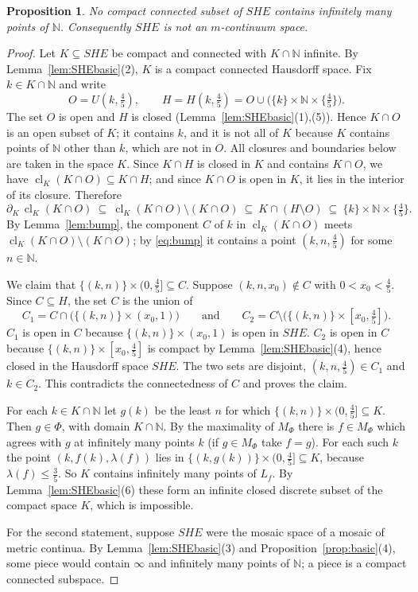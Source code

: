 \documentclass[11pt]{amsart}
\newtheorem{proposition}[theorem]{Proposition}
\theoremstyle{definition}
\theoremstyle{remark}
\newcommand{\N}{\mathbb{N}}
\newcommand{\cl}{\operatorname{cl}}
\newcommand{\SHE}{\mathit{SHE}}
\numberwithin{equation}{section}
\begin{document}
\begin{proposition}\label{prop:SHE}
No compact connected subset of $\SHE$ contains infinitely many points of $\N$. Consequently $\SHE$ is not an $m$-continuum space.
\end{proposition}
\begin{proof}
Let $K\subseteq\SHE$ be compact and connected with $K\cap\N$ infinite. By Lemma~\ref{lem:SHEbasic}(2), $K$ is a compact connected Hausdorff space. Fix $k\in K\cap\N$ and write
\[O=U(k,\tfrac45),\qquad H=H(k,\tfrac45)=O\cup\bigl(\{k\}\times\N\times\{\tfrac45\}\bigr).\]
The set $O$ is open and $H$ is closed (Lemma~\ref{lem:SHEbasic}(1),(5)). Hence $K\cap O$ is an open subset of $K$; it contains $k$, and it is not all of $K$ because $K$ contains points of $\N$ other than $k$, which are not in $O$. All closures and boundaries below are taken in the space $K$. Since $K\cap H$ is closed in $K$ and contains $K\cap O$, we have $\cl_K(K\cap O)\subseteq K\cap H$; and since $K\cap O$ is open in $K$, it lies in the interior of its closure. Therefore
\begin{equation}\label{eq:bump}
\partial_K\,\cl_K(K\cap O)\ \subseteq\ \cl_K(K\cap O)\setminus(K\cap O)\ \subseteq\ K\cap(H\setminus O)\ \subseteq\ \{k\}\times\N\times\{\tfrac45\}.
\end{equation}
By Lemma~\ref{lem:bump}, the component $C$ of $k$ in $\cl_K(K\cap O)$ meets $\cl_K(K\cap O)\setminus(K\cap O)$; by \eqref{eq:bump} it contains a point $(k,n,\frac45)$ for some $n\in\N$.

We claim that $\{(k,n)\}\times(0,\frac45]\subseteq C$. Suppose $(k,n,x_0)\notin C$ with $0<x_0<\frac45$. Since $C\subseteq H$, the set $C$ is the union of
\[C_1=C\cap\bigl(\{(k,n)\}\times(x_0,1)\bigr)\qquad\text{and}\qquad C_2=C\setminus\bigl(\{(k,n)\}\times[x_0,\tfrac45]\bigr).\]
$C_1$ is open in $C$ because $\{(k,n)\}\times(x_0,1)$ is open in $\SHE$. $C_2$ is open in $C$ because $\{(k,n)\}\times[x_0,\frac45]$ is compact by Lemma~\ref{lem:SHEbasic}(4), hence closed in the Hausdorff space $\SHE$. The two sets are disjoint, $(k,n,\frac45)\in C_1$ and $k\in C_2$. This contradicts the connectedness of $C$ and proves the claim.

For each $k\in K\cap\N$ let $g(k)$ be the least $n$ for which $\{(k,n)\}\times(0,\frac45]\subseteq K$. Then $g\in\Phi$, with domain $K\cap\N$. By the maximality of $M_\Phi$ there is $f\in M_\Phi$ which agrees with $g$ at infinitely many points $k$ (if $g\in M_\Phi$ take $f=g$). For each such $k$ the point $(k,f(k),\lambda(f))$ lies in $\{(k,g(k))\}\times(0,\frac45]\subseteq K$, because $\lambda(f)\le\frac35$. So $K$ contains infinitely many points of $L_f$. By Lemma~\ref{lem:SHEbasic}(6) these form an infinite closed discrete subset of the compact space $K$, which is impossible.

For the second statement, suppose $\SHE$ were the mosaic space of a mosaic of metric continua. By Lemma~\ref{lem:SHEbasic}(3) and Proposition~\ref{prop:basic}(4), some piece would contain $\infty$ and infinitely many points of $\N$; a piece is a compact connected subspace.
\end{proof}
\end{document}
